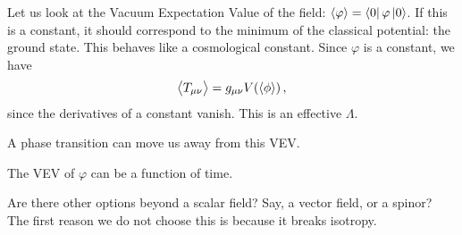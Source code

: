 \documentclass[main.tex]{subfiles}
\begin{document}
Let us look at the Vacuum Expectation Value of the field: \(\expval{\varphi } = \bra{0} \varphi \ket{0}\). If this is a constant, it should correspond to the minimum of the classical potential: the ground state. 
This behaves like a cosmological constant. 
Since \(\varphi \) is a constant, we have 
%
\begin{align}
\expval{T_{\mu \nu }} = g_{\mu \nu } V(\expval{\phi })
\,,
\end{align}
%
since the derivatives of a constant vanish. 
This is an effective \(\Lambda \). 

A phase transition can move us away from this VEV.

The VEV of \(\varphi \) can be a function of time. 

Are there other options beyond a scalar field? Say, a vector field, or a spinor?
The first reason we do not choose this is because it breaks isotropy.
\end{document}

